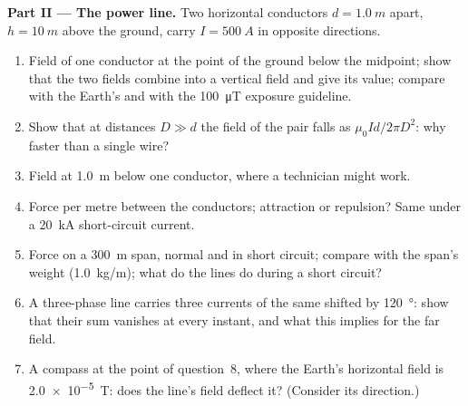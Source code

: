 \begin{problem}
\medskip
\noindent\textbf{Part II --- The power line.}
Two horizontal conductors $d = \qty{1.0}{m}$ apart, $h = \qty{10}{m}$ above
the ground, carry $I = \qty{500}{A}$ in opposite directions.
\begin{enumerate}[resume]
  \item Field of one conductor at the point of the ground below the
        midpoint; show that the two fields combine into a vertical field
        and give its value; compare with the Earth's and with the
        \qty{100}{\micro T} exposure guideline.
  \item Show that at distances $D \gg d$ the field of the pair falls as
        $\mu_0Id/2\pi D^2$: why faster than a single wire?
  \item Field at \qty{1.0}{m} below one conductor, where a technician
        might work.
  \item Force per metre between the conductors; attraction or
        repulsion? Same under a \qty{20}{kA} short-circuit current.
  \item Force on a \qty{300}{m} span, normal and in short circuit;
        compare with the span's weight (\qty{1.0}{kg/m}); what do the lines
        do during a short circuit?
  \item A three-phase line carries three currents of the same 
        shifted by \qty{120}{\degree}: show that their sum vanishes at
        every instant, and what this implies for the far field.
  \item A compass at the point of question~8, where the Earth's
        horizontal field is \qty{2.0e-5}{T}: does the line's field
        deflect it? (Consider its direction.)
\end{enumerate}


\end{problem}
